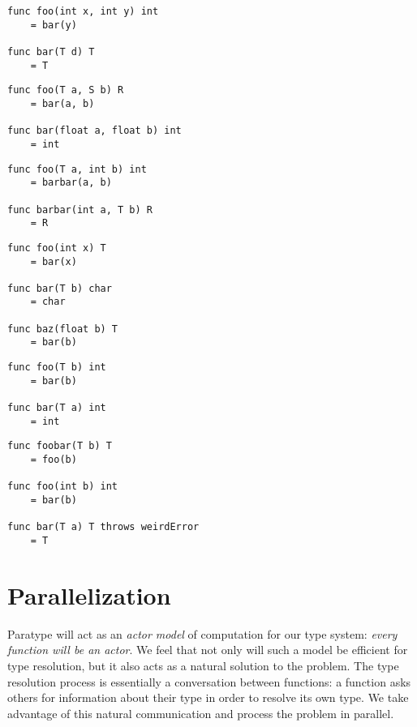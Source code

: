 \documentclass{acm_proc_article-sp}
\begin{document}
\begin{lstlisting}[caption=Explicit context provided by parents,language=Paratype,label=lst:cbyparent]
func foo(int x, int y) int
    = bar(y)

func bar(T d) T
    = T
\end{lstlisting}

\begin{lstlisting}[caption=Explicit context provided by child,language=Paratype,label=lst:cbychild]
func foo(T a, S b) R
    = bar(a, b)

func bar(float a, float b) int
    = int
\end{lstlisting}

\begin{lstlisting}[caption=Explicit context provided by child and parent,language=Paratype,label=lst:cbyboth]
func foo(T a, int b) int
    = barbar(a, b)

func barbar(int a, T b) R
    = R
\end{lstlisting}

\begin{lstlisting}[caption=Need to maintain partial contexts,language=Paratype,label=lst:partial]
func foo(int x) T
    = bar(x)

func bar(T b) char
    = char

func baz(float b) T
    = bar(b)
\end{lstlisting}

\begin{lstlisting}[caption=Unhalting context resolution,language=Paratype,label=lst:unhalting]
func foo(T b) int
    = bar(b)

func bar(T a) int
    = int
\end{lstlisting}

\begin{lstlisting}[caption=Errors,language=Paratype,label=lst:errors]
func foobar(T b) T
    = foo(b)

func foo(int b) int
    = bar(b)

func bar(T a) T throws weirdError
    = T
\end{lstlisting}


\section{Parallelization}

Paratype will act as an \emph{actor model} of computation for our type
system: \emph{every function will be an actor}. We feel that not only will
such a model be efficient for type resolution, but it also acts as a
natural solution to the problem. The type resolution process is
essentially a conversation between functions: a function asks others for
information about their type in order to resolve its own type. We take
advantage of this natural communication and process the problem in
parallel.
\end{document}
